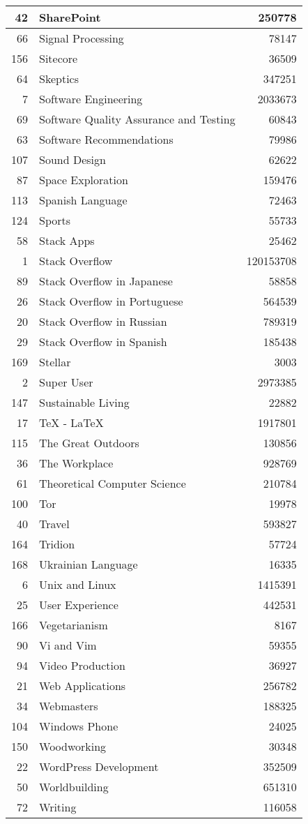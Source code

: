 \documentclass[]{book}
\theoremstyle{definition}
\theoremstyle{definition}
\theoremstyle{definition}
\theoremstyle{remark}
\begin{document}
\begin{tabular}{r|l|r}
\hline
42 & SharePoint & 250778\\
\hline
66 & Signal Processing & 78147\\
\hline
156 & Sitecore & 36509\\
\hline
64 & Skeptics & 347251\\
\hline
7 & Software Engineering & 2033673\\
\hline
69 & Software Quality Assurance and Testing & 60843\\
\hline
63 & Software Recommendations & 79986\\
\hline
107 & Sound Design & 62622\\
\hline
87 & Space Exploration & 159476\\
\hline
113 & Spanish Language & 72463\\
\hline
124 & Sports & 55733\\
\hline
58 & Stack Apps & 25462\\
\hline
1 & Stack Overflow & 120153708\\
\hline
89 & Stack Overflow in Japanese & 58858\\
\hline
26 & Stack Overflow in Portuguese & 564539\\
\hline
20 & Stack Overflow in Russian & 789319\\
\hline
29 & Stack Overflow in Spanish & 185438\\
\hline
169 & Stellar & 3003\\
\hline
2 & Super User & 2973385\\
\hline
147 & Sustainable Living & 22882\\
\hline
17 & TeX - LaTeX & 1917801\\
\hline
115 & The Great Outdoors & 130856\\
\hline
36 & The Workplace & 928769\\
\hline
61 & Theoretical Computer Science & 210784\\
\hline
100 & Tor & 19978\\
\hline
40 & Travel & 593827\\
\hline
164 & Tridion & 57724\\
\hline
168 & Ukrainian Language & 16335\\
\hline
6 & Unix and Linux & 1415391\\
\hline
25 & User Experience & 442531\\
\hline
166 & Vegetarianism & 8167\\
\hline
90 & Vi and Vim & 59355\\
\hline
94 & Video Production & 36927\\
\hline
21 & Web Applications & 256782\\
\hline
34 & Webmasters & 188325\\
\hline
104 & Windows Phone & 24025\\
\hline
150 & Woodworking & 30348\\
\hline
22 & WordPress Development & 352509\\
\hline
50 & Worldbuilding & 651310\\
\hline
72 & Writing & 116058\\
\hline
\end{tabular}
\end{document}
